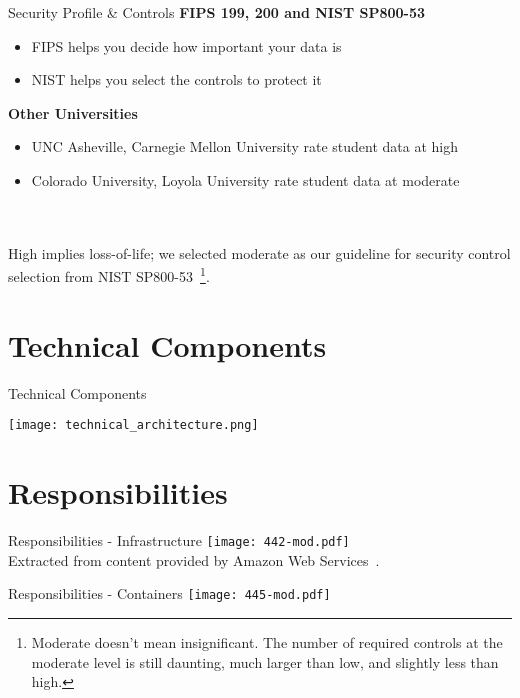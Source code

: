\documentclass[t,handout]{beamer}   %
\begin{document}
\begin{frame}{Security Profile \& Controls}
\textbf{FIPS 199, 200 and NIST SP800-53}
{\small
\begin{itemize}
\item FIPS helps you decide how important your data is
\item NIST helps you select the controls to protect it
\end{itemize}
}

\textbf{Other Universities}
{\small
\begin{itemize}
\item UNC Asheville, Carnegie Mellon University rate student data at high
\item Colorado University, Loyola University rate student data at moderate
\end{itemize}
}
~\\~\\
High implies loss-of-life; we selected moderate as our guideline for security control selection from NIST SP800-53~\footnote{Moderate doesn't mean insignificant. The number of required controls at the moderate level is still daunting, much larger than low, and slightly less than high.}.


\end{frame}

\section{Technical Components}

\begin{frame}{Technical Components}
	\begin{center}
		\texttt{[image: technical\_architecture.png]}
	\end{center}
\end{frame}


\section{Responsibilities}

\begin{frame}{Responsibilities - Infrastructure}
 	\texttt{[image: 442-mod.pdf]} \\
 	{\tiny Extracted from content provided by Amazon Web Services~.}
\end{frame}

\begin{frame}{Responsibilities - Containers}
 	\texttt{[image: 445-mod.pdf]}
\end{frame}
\end{document}
